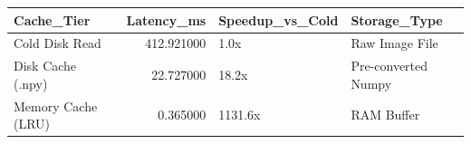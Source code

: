 \begin{tabular}{lrll}
\toprule
Cache\_Tier & Latency\_ms & Speedup\_vs\_Cold & Storage\_Type \\
\midrule
Cold Disk Read & 412.921000 & 1.0x & Raw Image File \\
Disk Cache (.npy) & 22.727000 & 18.2x & Pre-converted Numpy \\
Memory Cache (LRU) & 0.365000 & 1131.6x & RAM Buffer \\
\bottomrule
\end{tabular}
